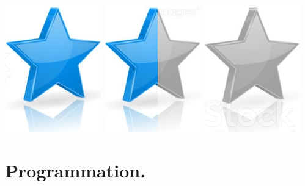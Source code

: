 \documentclass[10pt,a4paper,sans]{article}
\begin{document}
\begin{minipage}[t]{0.28\textwidth}
\begin{mdframed}[style=cadreCompetences]
\begin{itemize}
{                    \includegraphics[scale=0.20]{img/star.png} \hspace{-0.2cm}
                    \includegraphics[scale=0.20]{img/half_star.png} \hspace{-0.2cm}
                    \includegraphics[scale=0.20]{img/empty_star.png}}
            \end{itemize}

        \section{Programmation.}

\end{mdframed}
\end{minipage}
\end{document}
